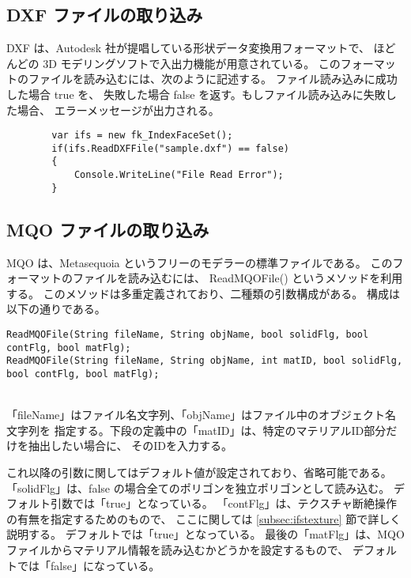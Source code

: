 \subsection{DXF ファイルの取り込み}
DXF は、Autodesk 社が提唱している形状データ変換用フォーマットで、
ほどんどの 3D モデリングソフトで入出力機能が用意されている。
このフォーマットのファイルを読み込むには、次のように記述する。
ファイル読み込みに成功した場合 true を、
失敗した場合 false を返す。もしファイル読み込みに失敗した場合、
エラーメッセージが出力される。
\\
\begin{screen}
\begin{verbatim}
        var ifs = new fk_IndexFaceSet();
        if(ifs.ReadDXFFile("sample.dxf") == false)
        {
            Console.WriteLine("File Read Error");
        }
\end{verbatim}
\end{screen}

\subsection{MQO ファイルの取り込み} \label{subsec:mqoread}
MQO は、Metasequoia というフリーのモデラーの標準ファイルである。
このフォーマットのファイルを読み込むには、
ReadMQOFile() というメソッドを利用する。
このメソッドは多重定義されており、二種類の引数構成がある。
構成は以下の通りである。
\\
\begin{screen}
\begin{small}
\begin{verbatim}
ReadMQOFile(String fileName, String objName, bool solidFlg, bool contFlg, bool matFlg);
ReadMQOFile(String fileName, String objName, int matID, bool solidFlg, bool contFlg, bool matFlg);
\end{verbatim}
\end{small}
\end{screen}
~ \\
「fileName」はファイル名文字列、「objName」はファイル中のオブジェクト名文字列を
指定する。下段の定義中の「matID」は、特定のマテリアルID部分だけを抽出したい場合に、
そのIDを入力する。

これ以降の引数に関してはデフォルト値が設定されており、省略可能である。
「solidFlg」は、false の場合全てのポリゴンを独立ポリゴンとして読み込む。
デフォルト引数では「true」となっている。
「contFlg」は、テクスチャ断絶操作の有無を指定するためのもので、
ここに関しては \ref{subsec:ifstexture} 節で詳しく説明する。
デフォルトでは「true」となっている。
最後の「matFlg」は、MQOファイルからマテリアル情報を読み込むかどうかを設定するもので、
デフォルトでは「false」になっている。

